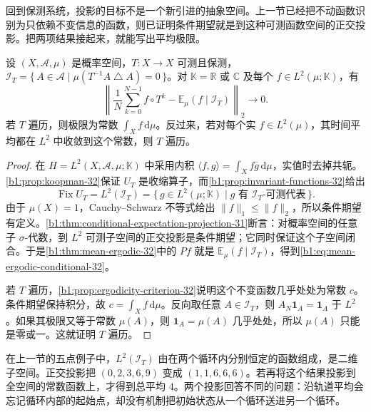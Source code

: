 \ProseParagraphBreak

回到保测系统，投影的目标不是一个新引进的抽象空间。上一节已经把不动函数识别为只依赖不变信息的函数，则已证明条件期望就是到这种可测函数空间的正交投影。把两项结果接起来，就能写出平均极限。

\begin{corollary}[平方平均极限与条件期望]\label{b1:cor:mean-ergodic-conditional-32}
设 \((X,\mathcal A,\mu)\) 是概率空间，\(T\colon X\rightarrow X\) 可测且保测，\(\mathcal I_T=\{\,A\in\mathcal A\mid\mu(T^{-1}A\mathbin{\triangle}A)=0\,\}\)。对 \(\mathbb K=\mathbb R\) 或 \(\mathbb C\) 及每个 \(f\in L^2(\mu;\mathbb K)\)，有
\begin{equation}\label{b1:eq:mean-ergodic-conditional-32}
 \left\|\frac1N\sum_{k=0}^{N-1}f\circ T^k
       -\mathbb E_\mu(f\mid\mathcal I_T)\right\|_2\longrightarrow0.
\end{equation}
若 \(T\) 遍历，则极限为常数 \(\int_Xf\,\mathrm d\mu\)。反过来，若对每个实 \(f\in L^2(\mu)\)，其时间平均都在 \(L^2\) 中收敛到这个常数，则 \(T\) 遍历。
\end{corollary}
\begin{proof}
在 \(H=L^2(X,\mathcal A,\mu;\mathbb K)\) 中采用内积
\(\langle f,g\rangle=\int_X f\overline g\,\mathrm d\mu\)，实值时去掉共轭。\cref{b1:prop:koopman-32}保证 \(U_T\) 是收缩算子，而\cref{b1:prop:invariant-functions-32}给出
\[
 \operatorname{Fix}U_T
 =L^2(\mathcal I_T)
 =\{\,g\in L^2(\mu;\mathbb K)\mid g\text{ 有 }\mathcal I_T\text{-可测代表}\,\}.
\]
由于 \(\mu(X)=1\)，Cauchy--Schwarz 不等式给出 \(\|f\|_1\leq\|f\|_2\)，所以条件期望有定义。\cref{b1:thm:conditional-expectation-projection-31}断言：对概率空间的任意子 \(\sigma\)-代数，到 \(L^2\) 可测子空间的正交投影是条件期望；它同时保证这个子空间闭合。于是\cref{b1:thm:mean-ergodic-32}中的 \(Pf\) 就是 \(\mathbb E_\mu(f\mid\mathcal I_T)\)，得到\eqref{b1:eq:mean-ergodic-conditional-32}。

若 \(T\) 遍历，\cref{b1:prop:ergodicity-criterion-32}说明这个不变函数几乎处处为常数 \(c\)。条件期望保持积分，故 \(c=\int_X f\,\mathrm d\mu\)。反向取任意 \(A\in\mathcal I_T\)，则 \(A_N\mathbf1_A=\mathbf1_A\) 于 \(L^2\)。如果其极限又等于常数 \(\mu(A)\)，则 \(\mathbf1_A=\mu(A)\) 几乎处处，所以 \(\mu(A)\) 只能是零或一。这就证明 \(T\) 遍历。
\end{proof}

在上一节的五点例子中，\(L^2(\mathcal I_T)\) 由在两个循环内分别恒定的函数组成，是二维子空间。正交投影把 \((0,2,3,6,9)\) 变成 \((1,1,6,6,6)\)。若再将这个结果投影到全空间的常数函数上，才得到总平均 \(4\)。两个投影回答不同的问题：沿轨道平均会忘记循环内部的起始点，却没有机制把初始状态从一个循环送进另一个循环。


